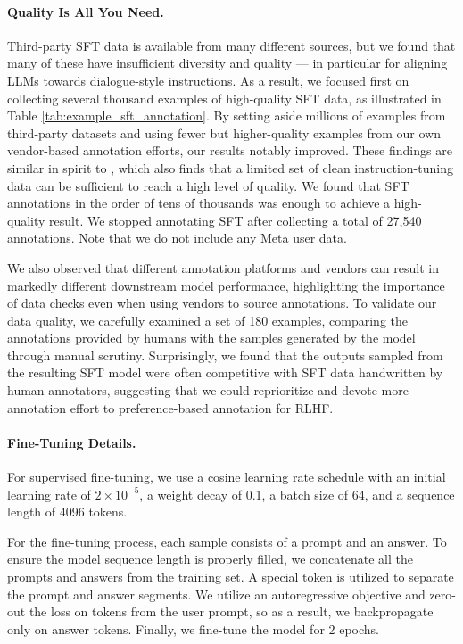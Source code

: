\documentclass{article}
\begin{document}
\paragraph{Quality Is All You Need.} 
Third-party SFT data is available from many different sources, but we found that many of these have insufficient diversity and quality --- in particular for aligning LLMs towards dialogue-style instructions. 
As a result, we focused first on collecting several thousand examples of high-quality SFT data, as illustrated in Table \ref{tab:example_sft_annotation}. 
By setting aside millions of examples from third-party datasets and using fewer but higher-quality examples from our own vendor-based annotation efforts, our results notably improved. These findings are similar in spirit to \cite{zhou-etal-2023-lima}, which also finds that a limited set of clean instruction-tuning data can be sufficient to reach a high level of quality. 
We found that SFT annotations in the order of tens of thousands was enough to achieve a high-quality result. We stopped annotating SFT after collecting a total of 27,540 annotations. 
Note that we do not include any Meta user data. 

We also observed that different annotation platforms and vendors can result in markedly different downstream model performance, highlighting the importance of data checks even when using vendors to source annotations. 
To validate our data quality, we carefully examined a set of 180 examples, comparing the annotations provided by humans with the samples generated by the model through manual scrutiny. Surprisingly, we found that the outputs sampled from the resulting SFT model were often competitive with SFT data handwritten by human annotators, suggesting that we could reprioritize and devote more annotation effort to preference-based annotation for RLHF.


\paragraph{Fine-Tuning Details.}
For supervised fine-tuning, we use a cosine learning rate schedule with an initial learning rate of $2\times 10^{-5}$, a weight decay of 0.1, a batch size of 64, and a sequence length of 4096 tokens.

For the fine-tuning process, each sample consists of a prompt and an answer. To ensure the model sequence length is properly filled, we concatenate all the prompts and answers from the training set. A special token is utilized to separate the prompt and answer segments. We utilize an autoregressive objective and zero-out the loss on tokens from the user prompt, so as a result, we backpropagate only on answer tokens.
Finally, we fine-tune the model for 2 epochs.
\end{document}
